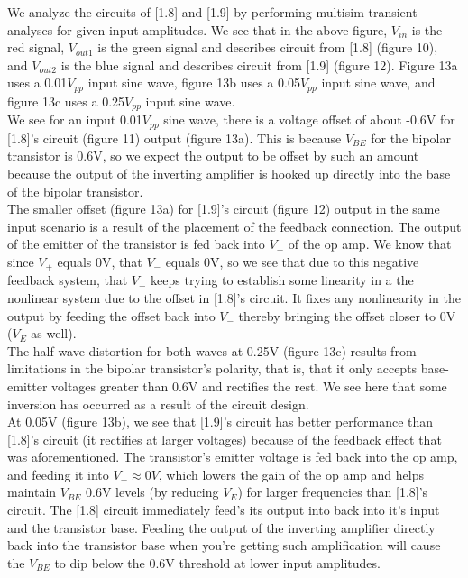 \documentclass{article}
\begin{document}
    We analyze the circuits of [1.8] and [1.9] by performing multisim transient analyses for given input amplitudes. We see that in the above figure, $V_{in}$ is the red signal, $V_{out1}$ is the green signal and describes circuit from [1.8] (figure 10), and $V_{out2}$ is the blue signal and describes circuit from [1.9] (figure 12). Figure 13a uses a 0.01$V_{pp}$ input sine wave, figure 13b uses a 0.05$V_{pp}$ input sine wave, and figure 13c uses a 0.25$V_{pp}$ input sine wave.\\\indent We see for an input 0.01$V_{pp}$ sine wave, there is a voltage offset of about -0.6V for [1.8]'s circuit (figure 11) output (figure 13a). This is because $V_{BE}$ for the bipolar transistor is 0.6V, so we expect the output to be offset by such an amount because the output of the inverting amplifier is hooked up directly into the base of the bipolar transistor.\\\indent The smaller offset (figure 13a) for [1.9]'s circuit (figure 12) output in the same input scenario is a result of the placement of the feedback connection. The output of the emitter of the transistor is fed back into $V_-$ of the op amp. We know that since $V_+$ equals 0V, that $V_-$ equals 0V, so we see that due to this negative feedback system, that $V_-$ keeps trying to establish some linearity in a the nonlinear system due to the offset in [1.8]'s circuit. It fixes any nonlinearity in the output by feeding the offset back into $V_-$ thereby bringing the offset closer to 0V ($V_E$ as well).
    \\\indent The half wave distortion for both waves at 0.25V (figure 13c) results from limitations in the bipolar transistor's polarity, that is, that it only accepts base-emitter voltages greater than 0.6V and rectifies the rest. We see here that some inversion has occurred as a result of the circuit design.
    \\\indent At 0.05V (figure 13b), we see that [1.9]'s circuit has better performance than [1.8]'s circuit (it rectifies at larger voltages) because of the feedback effect that was aforementioned. The transistor's emitter voltage is fed back into the op amp, and feeding it into $V_- \approx 0V$, which lowers the gain of the op amp and helps maintain $V_{BE}$ 0.6V levels (by reducing $V_E$) for larger frequencies than [1.8]'s circuit. The [1.8] circuit immediately feed's its output into back into it's input and the transistor base. Feeding the output of the inverting amplifier directly back into the transistor base when you're getting such amplification will cause the $V_{BE}$ to dip below the 0.6V threshold at lower input amplitudes.
    
\end{document}

